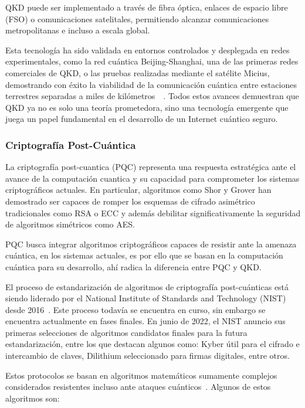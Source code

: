 QKD puede ser implementado a través de fibra óptica, enlaces de espacio libre (FSO) o comunicaciones satelitales, permitiendo alcanzar comunicaciones metropolitanas e incluso a escala global.

Esta tecnología ha sido validada en entornos controlados y desplegada en redes experimentales, como la red cuántica Beijing-Shanghai, una de las primeras redes comerciales de QKD, o las pruebas realizadas mediante el satélite Micius, demostrando con éxito la viabilidad de la comunicación cuántica entre estaciones terrestres separadas a miles de kilómetros~\cite{Yin2017}~\cite{Chen2021}. Todos estos avances demuestran que QKD ya no es solo una teoría prometedora, sino una tecnología emergente que juega un papel fundamental en el desarrollo de un Internet cuántico seguro.

\subsubsection{Criptografía Post-Cuántica}

La criptografía post-cuantica (PQC) representa una respuesta estratégica ante el avance de la computación cuantica y su capacidad para comprometer los sistemas criptográficos actuales. En particular, algoritmos como Shor y Grover han demostrado ser capaces de romper los esquemas de cifrado asimétrico tradicionales como RSA o ECC y además debilitar significativamente la seguridad de algoritmos simétricos como AES.

PQC busca integrar algoritmos criptográficos capaces de resistir ante la amenaza cuántica, en los sistemas actuales, es por ello que se basan en la computación cuántica para su desarrollo, ahí radica la diferencia entre PQC y QKD.

El proceso de estandarización de algoritmos de criptografía post-cuánticas está siendo liderado por el National Institute of Standards and Technology (NIST) desde 2016~\cite{NIST_PQC_Project}. Este proceso todavía se encuentra en curso, sin embargo se encuentra actualmente en fases finales. En junio de 2022, el NIST anuncio sus primeras selecciones de algoritmos candidatos finales para la futura estandarización, entre los que destacan algunos como: Kyber útil para el cifrado e intercambio de claves, Dilithium seleccionado para firmas digitales, entre otros.

Estos protocolos se basan en algoritmos matemáticos sumamente complejos considerados resistentes incluso ante ataques cuánticos~\cite{Kumar2022}. Algunos de estos algoritmos son:

